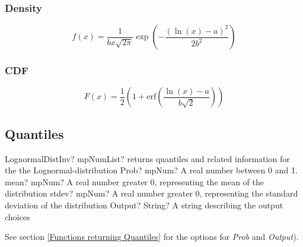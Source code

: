 \subsubsection{Density}
\label{LognormalDistributionDensity}

\begin{equation} 
	f(x)= \frac{1}{b x \sqrt{2\pi}} \exp \left(- \frac{(\ln(x) - a)^2}{2b^2}\right)
\end{equation}


\subsubsection{CDF}
\label{LognormalDistributionCDF}
\begin{equation} 
	F(x)= \frac{1}{2}  \left(1+\text{erf} \left( \frac{\ln(x) - a}{b\sqrt{2}}\right)\right)
\end{equation}



\subsection{Quantiles}
\label{LognormalDistributionQuantiles}


\begin{mpFunctionsExtract}
	\mpFunctionFour
	{LognormalDistInv? mpNumList? returns quantiles and related information for the the Lognormal-distribution}
	{Prob? mpNum? A real number between 0 and 1.}
	{mean? mpNum? A real number greater 0, representing the mean of the distribution}
	{stdev? mpNum? A real number greater 0, representing the standard deviation of the distribution}
	{Output? String? A string describing the output choices}
\end{mpFunctionsExtract}

See section \ref{Functions returning Quantiles} for the options for  {\itshape\sffamily Prob} and {\itshape\sffamily Output}). 

%
%
%


